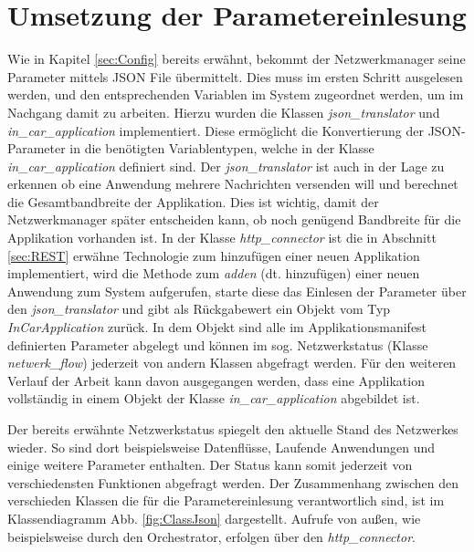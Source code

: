 \section{Umsetzung der Parametereinlesung}
Wie in Kapitel \ref{sec:Config} bereits erwähnt, bekommt der Netzwerkmanager seine Parameter mittels \ac{JSON} File übermittelt. Dies muss im ersten Schritt ausgelesen werden, und den entsprechenden Variablen im System zugeordnet werden, um im Nachgang damit zu arbeiten. Hierzu wurden die Klassen \emph{json\_translator} und \emph{in\_car\_application} implementiert. Diese ermöglicht die Konvertierung der \ac{JSON}-Parameter in die benötigten Variablentypen, welche in der Klasse \emph{in\_car\_application} definiert sind. Der \emph{json\_translator} ist auch in der Lage zu erkennen ob eine Anwendung mehrere Nachrichten versenden will und berechnet die Gesamtbandbreite der Applikation. Dies ist wichtig, damit der Netzwerkmanager später entscheiden kann, ob noch genügend Bandbreite für die Applikation vorhanden ist. 
\newpage
In der Klasse \emph{http\_connector} ist die in Abschnitt \ref{sec:REST} erwähne Technologie zum hinzufügen einer neuen Applikation implementiert, wird die Methode zum  \emph{adden} (dt. hinzufügen) einer neuen Anwendung zum System aufgerufen, starte diese das Einlesen der Parameter über den \emph{json\_translator} und gibt als Rückgabewert ein  Objekt vom Typ \emph{InCarApplication} zurück. In dem Objekt sind alle im Applikationsmanifest definierten Parameter abgelegt und können im sog. Netzwerkstatus (Klasse \emph{netwerk\_flow}) jederzeit von andern Klassen abgefragt werden. Für den weiteren Verlauf der Arbeit kann davon ausgegangen werden, dass eine Applikation vollständig in einem Objekt der Klasse \emph{in\_car\_application} abgebildet ist. 


Der bereits erwähnte Netzwerkstatus spiegelt den aktuelle Stand des Netzwerkes wieder. So sind dort beispielsweise Datenflüsse, Laufende Anwendungen und  einige weitere Parameter enthalten. Der Status kann somit jederzeit von verschiedensten Funktionen abgefragt werden. Der Zusammenhang zwischen den verschieden Klassen die für die Parametereinlesung verantwortlich sind, ist im Klassendiagramm Abb. \ref{fig:ClassJson} dargestellt. Aufrufe von außen, wie beispielsweise durch den Orchestrator, erfolgen über den \emph{http\_connector}.



